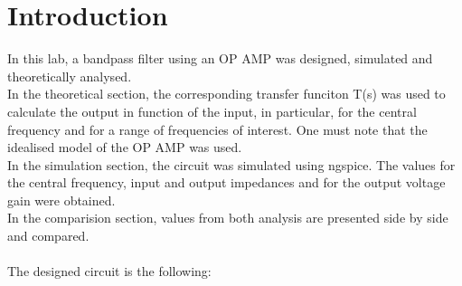 \section{Introduction}
\label{sec:intro}
In this lab, a bandpass filter using an OP AMP was designed, simulated and theoretically analysed.\\
 In the theoretical section, the corresponding transfer funciton T(s) was used to calculate the output in function of the input, in particular, for the central frequency and for a range of frequencies of interest. One must note that the idealised model of the OP AMP was used. \\
 In the simulation section, the circuit was simulated using ngspice. The values for the central frequency, input and output impedances and for the output voltage gain were obtained.\\
In the comparision section, values from both analysis are presented side by side and compared.\\ \\
The designed circuit is the following:


